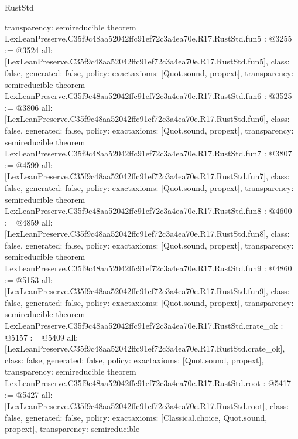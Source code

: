 \begin{lexlean}{RustStd}
\begin{coremodule}
{  transparency: semireducible
}
theorem LexLeanPreserve.C35f9c48aa52042ffc91ef72c3a4ea70e.R17.RustStd.fun5 : @3255 := @3524 {
  all: [LexLeanPreserve.C35f9c48aa52042ffc91ef72c3a4ea70e.R17.RustStd.fun5],
  class: false,
  generated: false,
  policy: exact{axioms: [Quot.sound, propext]},
  transparency: semireducible
}
theorem LexLeanPreserve.C35f9c48aa52042ffc91ef72c3a4ea70e.R17.RustStd.fun6 : @3525 := @3806 {
  all: [LexLeanPreserve.C35f9c48aa52042ffc91ef72c3a4ea70e.R17.RustStd.fun6],
  class: false,
  generated: false,
  policy: exact{axioms: [Quot.sound, propext]},
  transparency: semireducible
}
theorem LexLeanPreserve.C35f9c48aa52042ffc91ef72c3a4ea70e.R17.RustStd.fun7 : @3807 := @4599 {
  all: [LexLeanPreserve.C35f9c48aa52042ffc91ef72c3a4ea70e.R17.RustStd.fun7],
  class: false,
  generated: false,
  policy: exact{axioms: [Quot.sound, propext]},
  transparency: semireducible
}
theorem LexLeanPreserve.C35f9c48aa52042ffc91ef72c3a4ea70e.R17.RustStd.fun8 : @4600 := @4859 {
  all: [LexLeanPreserve.C35f9c48aa52042ffc91ef72c3a4ea70e.R17.RustStd.fun8],
  class: false,
  generated: false,
  policy: exact{axioms: [Quot.sound, propext]},
  transparency: semireducible
}
theorem LexLeanPreserve.C35f9c48aa52042ffc91ef72c3a4ea70e.R17.RustStd.fun9 : @4860 := @5153 {
  all: [LexLeanPreserve.C35f9c48aa52042ffc91ef72c3a4ea70e.R17.RustStd.fun9],
  class: false,
  generated: false,
  policy: exact{axioms: [Quot.sound, propext]},
  transparency: semireducible
}
theorem LexLeanPreserve.C35f9c48aa52042ffc91ef72c3a4ea70e.R17.RustStd.crate_ok : @5157 := @5409 {
  all: [LexLeanPreserve.C35f9c48aa52042ffc91ef72c3a4ea70e.R17.RustStd.crate_ok],
  class: false,
  generated: false,
  policy: exact{axioms: [Quot.sound, propext]},
  transparency: semireducible
}
theorem LexLeanPreserve.C35f9c48aa52042ffc91ef72c3a4ea70e.R17.RustStd.root : @5417 := @5427 {
  all: [LexLeanPreserve.C35f9c48aa52042ffc91ef72c3a4ea70e.R17.RustStd.root],
  class: false,
  generated: false,
  policy: exact{axioms: [Classical.choice, Quot.sound, propext]},
  transparency: semireducible
}


\end{coremodule}
\end{lexlean}
